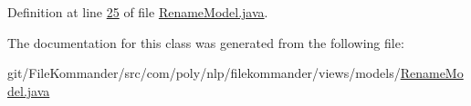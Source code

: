 Definition at line \hyperlink{L25}{25} of file \hyperlink{}{Rename\-Model.\-java}.



The documentation for this class was generated from the following file\-:\begin{DoxyCompactItemize}
\item 
git/\-File\-Kommander/src/com/poly/nlp/filekommander/views/models/\hyperlink{_rename_model_8java}{Rename\-Model.\-java}\end{DoxyCompactItemize}
